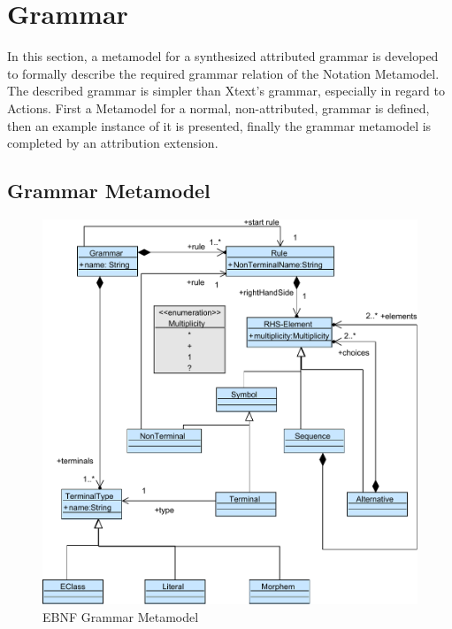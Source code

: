 \section{Grammar}
In this section, a metamodel for a synthesized attributed grammar is developed to formally describe the required grammar relation of the Notation Metamodel. The described grammar is simpler than Xtext's grammar, especially in regard to Actions. First a Metamodel for a normal, non-attributed, grammar is defined, then an example instance of it is presented, finally the grammar metamodel is completed by an attribution extension.

\subsection{Grammar Metamodel}
\begin{figure}
\centering
\includegraphics[scale=0.85]{gfx/ex/Grammar_CFG} 
\caption{EBNF Grammar Metamodel}
\label{MM:EBNF}
\end{figure}

